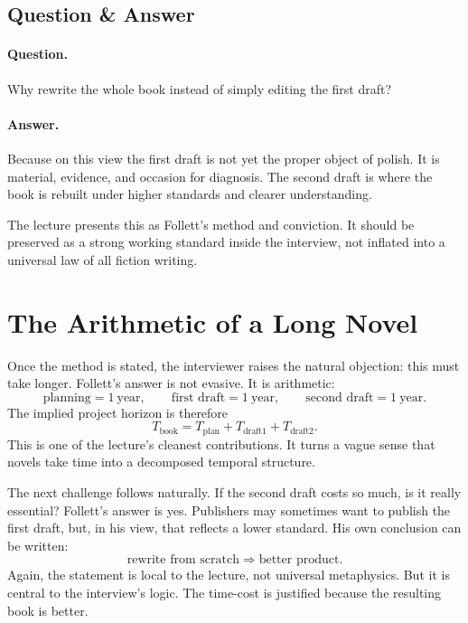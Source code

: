 \subsection{Question \& Answer}

\paragraph{Question.} Why rewrite the whole book instead of simply editing the first draft?

\paragraph{Answer.} Because on this view the first draft is not yet the proper object of polish. It is material, evidence, and occasion for diagnosis. The second draft is where the book is rebuilt under higher standards and clearer understanding.

\begin{remark}
The lecture presents this as Follett's method and conviction. It should be preserved as a strong working standard inside the interview, not inflated into a universal law of all fiction writing.
\end{remark}

\section{The Arithmetic of a Long Novel}

Once the method is stated, the interviewer raises the natural objection: this must take longer. Follett's answer is not evasive. It is arithmetic:
\begin{equation}
\text{planning} = 1\ \text{year}, \qquad
\text{first draft} = 1\ \text{year}, \qquad
\text{second draft} = 1\ \text{year}.
\end{equation}
The implied project horizon is therefore
\begin{equation}
T_{\text{book}} = T_{\text{plan}} + T_{\text{draft1}} + T_{\text{draft2}}.
\end{equation}
This is one of the lecture's cleanest contributions. It turns a vague sense that novels take time into a decomposed temporal structure.

The next challenge follows naturally. If the second draft costs so much, is it really essential? Follett's answer is yes. Publishers may sometimes want to publish the first draft, but, in his view, that reflects a lower standard. His own conclusion can be written:
\begin{equation}
\text{rewrite from scratch} \Rightarrow \text{better product}.
\end{equation}
Again, the statement is local to the lecture, not universal metaphysics. But it is central to the interview's logic. The time-cost is justified because the resulting book is better.


